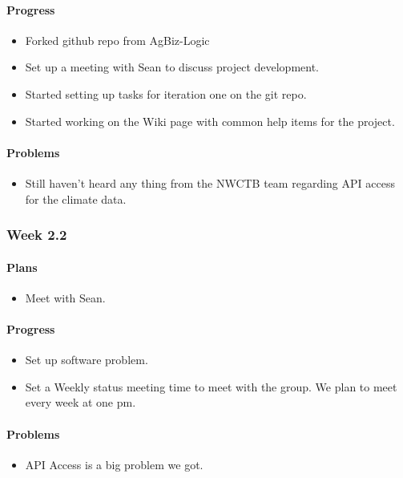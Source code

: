 \documentclass[onecolumn, draftclsnofoot,10pt, compsoc]{article}
\begin{document}
					\paragraph{Progress}
						\begin{itemize}
							\item Forked github repo from AgBiz-Logic
							\item Set up a meeting with Sean to discuss project development.
							\item Started setting up tasks for iteration one on the git repo.
							\item Started working on the Wiki page with common help items for the project.
						\end{itemize}
					\paragraph{Problems}
						\begin{itemize}
							\item Still haven't heard any thing from the NWCTB team regarding API access for the climate data.
						\end{itemize}

				\subsubsection{Week 2.2}
					\paragraph{Plans}
						\begin{itemize}
							\item Meet with Sean.
						\end{itemize}
					\paragraph{Progress}
						\begin{itemize}
							\item Set up software problem.
							\item Set a Weekly status meeting time to meet with the group. We plan to meet every week at one pm.
						\end{itemize}
					\paragraph{Problems}
						\begin{itemize}
							\item API Access is a big problem we got.
						\end{itemize}
\end{document}
